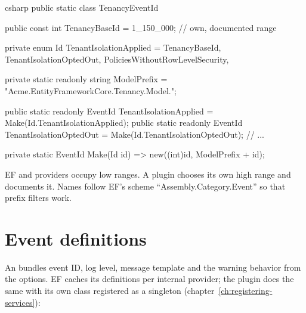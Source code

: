 \begin{sourcecode}{csharp}
public static class TenancyEventId
{
    public const int TenancyBaseId = 1_150_000;     // own, documented range

    private enum Id
    {
        TenantIsolationApplied = TenancyBaseId,
        TenantIsolationOptedOut,
        PoliciesWithoutRowLevelSecurity,
    }

    private static readonly string ModelPrefix = "Acme.EntityFrameworkCore.Tenancy.Model.";

    public static readonly EventId TenantIsolationApplied =
        Make(Id.TenantIsolationApplied);
    public static readonly EventId TenantIsolationOptedOut =
        Make(Id.TenantIsolationOptedOut);
    // ...

    private static EventId Make(Id id) => new((int)id, ModelPrefix + id);
}
\end{sourcecode}

EF and providers occupy low ranges. A plugin chooses its own high range and documents it.
Names follow EF's scheme “Assembly.Category.Event” so that prefix filters work.

\section{Event definitions}

An  bundles event ID, log level, message
template and the warning behavior from the options. EF caches its definitions per internal
provider; the plugin does the same with its own class registered as a singleton
(chapter~\ref{ch:registering-services}):

